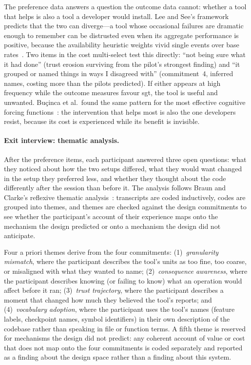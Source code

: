 The preference data answers a question the outcome data cannot: whether a tool
that helps is also a tool a developer would install. Lee and See's framework
predicts that the two can diverge---a tool whose occasional failures are
dramatic enough to remember can be distrusted even when its aggregate
performance is positive, because the availability heuristic weights vivid
single events over base rates~\cite{lee2004}. Two items in the cost
multi-select test this directly: ``not being sure what it had done'' (trust
erosion surviving from the pilot's strongest finding) and ``it grouped or named
things in ways I disagreed with'' (commitment~4, inferred names, costing more
than the pilots predicted). If either appears at high frequency while the
outcome measures favour sgt, the tool is useful and unwanted. Bu\c{c}inca
et al.\ found the same pattern for the most effective cognitive forcing
functions~\cite{bucinca2021}: the intervention that helps most is also the one
developers resist, because its cost is experienced while its benefit is
invisible.

\paragraph{Exit interview: thematic analysis.}
After the preference items, each participant answered three open questions: what
they noticed about how the two setups differed, what they would want changed in
the setup they preferred less, and whether they thought about the code
differently after the session than before it. The analysis follows Braun and
Clarke's reflexive thematic analysis~\cite{braun2006}: transcripts are coded
inductively, codes are grouped into themes, and themes are checked against the
design commitments to see whether the participant's account of their experience
maps onto the mechanism the design predicted or onto a mechanism the design did
not anticipate.

Four a priori themes derive from the four commitments: (1)~\emph{granularity
mismatch}, where the participant describes the tool's units as too fine, too
coarse, or misaligned with what they wanted to name; (2)~\emph{consequence
awareness}, where the participant describes knowing (or failing to know) what
an operation would affect before it ran; (3)~\emph{trust trajectory}, where the
participant describes a moment that changed how much they believed the tool's
reports; and (4)~\emph{vocabulary adoption}, where the participant uses the
tool's names (feature labels, checkpoint names, symbol identifiers) in their own
description of the codebase rather than speaking in file or function terms. A
fifth theme is reserved for mechanisms the design did not predict: any coherent
account of value or cost that does not map onto the four commitments is coded
separately and reported as a finding about the design space rather than a finding
about this system.

